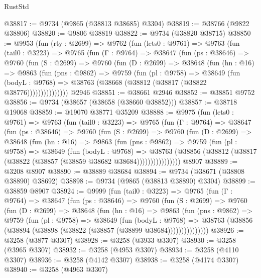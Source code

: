 \begin{lexlean}{RustStd}
\begin{coremodule}
@38817 := @9734 (@9865 (@38813 @38685) @3304)
@38819 := @38766 (@9822 @38806)
@38820 := @9806 @38819
@38822 := @9734 (@38820 @38715)
@38850 := @9953
    (fun (rty : @2699) =>
    @9762
      (fun (lets0 : @9761) =>
      @9763
        (fun (tail0 : @3223) =>
        @9765
          (fun (Γ : @9764) =>
          @38647
            (fun (ps : @38646) =>
            @9760
              (fun (S : @2699) =>
              @9760
                (fun (D : @2699) =>
                @38648
                  (fun (hn : @16) =>
                  @9863
                    (fun (pns : @9862) =>
                    @9759
                      (fun (pl : @9758) =>
                      @38649
                        (fun (bodyL : @9768) =>
                        @38763 (@38668 (@38812 (@38817 (@38822 @38776)))))))))))))))
    @2946
@38851 := @38661 @2946
@38852 := @38851 @9752
@38856 := @9734 (@38657 (@38658 (@38660 @38852)))
@38857 := @38718 @19068
@38859 := @19070 @38771 @35209
@38888 := @9975
    (fun (lets0 : @9761) =>
    @9763
      (fun (tail0 : @3223) =>
      @9765
        (fun (Γ : @9764) =>
        @38647
          (fun (ps : @38646) =>
          @9760
            (fun (S : @2699) =>
            @9760
              (fun (D : @2699) =>
              @38648
                (fun (hn : @16) =>
                @9863
                  (fun (pns : @9862) =>
                  @9759
                    (fun (pl : @9758) =>
                    @38649
                      (fun (bodyL : @9768) =>
                      @38763
                        (@38856
                          (@38812 (@38817 (@38822 (@38857 (@38859 @38682 @38684))))))))))))))))
    @8907
@38889 := @3208 @8907
@38890 := @38889 @38684
@38894 := @9734 (@38671 (@38808 @38890) @38692)
@38898 := @9734 (@9865 (@38813 @38890) @3304)
@38899 := @38859 @8907
@38924 := @9999
    (fun (tail0 : @3223) =>
    @9765
      (fun (Γ : @9764) =>
      @38647
        (fun (ps : @38646) =>
        @9760
          (fun (S : @2699) =>
          @9760
            (fun (D : @2699) =>
            @38648
              (fun (hn : @16) =>
              @9863
                (fun (pns : @9862) =>
                @9759
                  (fun (pl : @9758) =>
                  @38649
                    (fun (bodyL : @9768) =>
                    @38763 (@38856 (@38894 (@38898 (@38822 (@38857 (@38899 @38684)))))))))))))))
@38926 := @3258 (@3877 @3307)
@38928 := @3258 (@3933 @3307)
@38930 := @3258 (@3965 @3307)
@38932 := @3258 (@4953 @3307)
@38934 := @3258 (@4110 @3307)
@38936 := @3258 (@4142 @3307)
@38938 := @3258 (@4174 @3307)
@38940 := @3258 (@4963 @3307)

\end{coremodule}
\end{lexlean}
